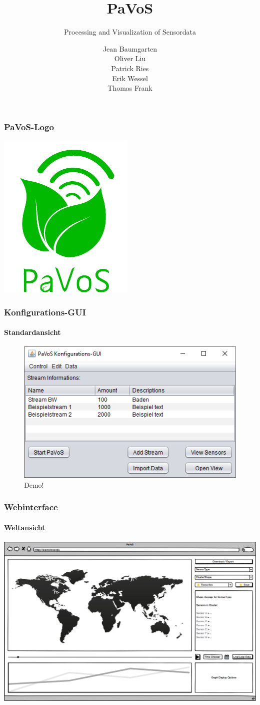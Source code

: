 \documentclass{beamer}
\title{PaVoS}
\subtitle{Processing and Visualization of Sensordata}
\author{Jean Baumgarten\\Oliver Liu\\Patrick Ries\\Erik Wessel\\Thomas Frank}
\begin{document}
	
\frame{\titlepage}

\begin{frame}
	\frametitle{PaVoS-Logo}
	\centering
	\includegraphics{images/PaVoSLogo-Erweitert}
\end{frame}

\begin{frame}
	\frametitle{Konfigurations-GUI}
	\framesubtitle{Standardansicht}
	\begin{figure}
		\centering
		\includegraphics[width=0.7\linewidth]{gui/backend/BackendGUIMain}
		\caption{Demo!}
	\end{figure}
\end{frame}

\begin{frame}
	\frametitle{Webinterface}
	\framesubtitle{Weltansicht}
	\centering
	\includegraphics[width=\linewidth]{gui/frontend/FrontGUIWorld}
\end{frame}
\end{document}
